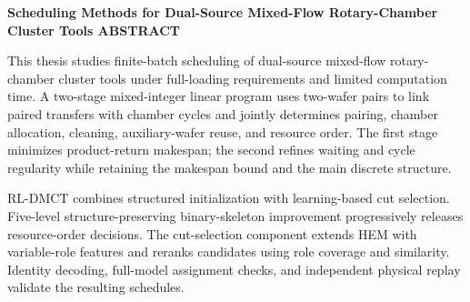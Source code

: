 \clearpage{}
\begin{center}\bfseries Scheduling Methods for Dual-Source Mixed-Flow Rotary-Chamber Cluster Tools
\vskip17pt ABSTRACT\end{center}\vskip16.5pt
This thesis studies finite-batch scheduling of dual-source mixed-flow rotary-chamber cluster tools under full-loading requirements and limited computation time. A two-stage mixed-integer linear program uses two-wafer pairs to link paired transfers with chamber cycles and jointly determines pairing, chamber allocation, cleaning, auxiliary-wafer reuse, and resource order. The first stage minimizes product-return makespan; the second refines waiting and cycle regularity while retaining the makespan bound and the main discrete structure.

RL-DMCT combines structured initialization with learning-based cut selection. Five-level structure-preserving binary-skeleton improvement progressively releases resource-order decisions. The cut-selection component extends HEM with variable-role features and reranks candidates using role coverage and similarity. Identity decoding, full-model assignment checks, and independent physical replay validate the resulting schedules.

